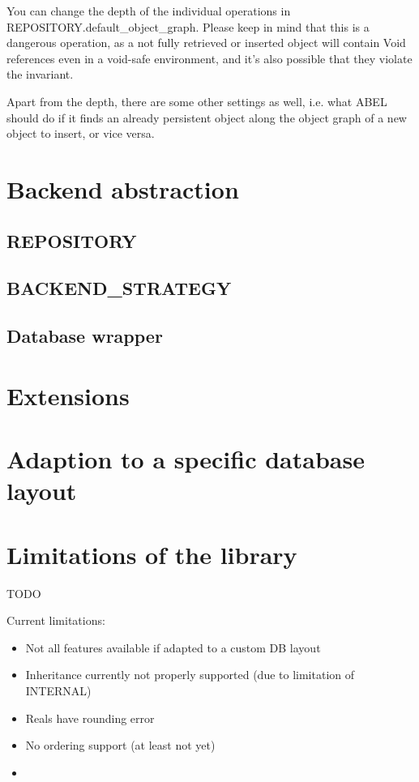 You can change the depth of the individual operations in REPOSITORY.default\_object\_graph. 
Please keep in mind that this is a dangerous operation, as a not fully retrieved or inserted object will contain Void references even in a void-safe environment, and it's also possible that they violate the invariant.

Apart from the depth, there are some other settings as well, i.e. what ABEL should do if it finds an already persistent object along the object graph of a new object to insert, or vice versa.

\section{Backend abstraction}


\subsection{REPOSITORY}

\subsection{BACKEND\_STRATEGY}

\subsection{Database wrapper}


\section{Extensions}

\section{Adaption to a specific database layout}


\section{Limitations of the library}
TODO

Current limitations:
\begin{itemize}
\item Not all features available if adapted to a custom DB layout 
\item Inheritance currently not properly supported (due to limitation of INTERNAL)
\item Reals have rounding error
\item No ordering support (at least not yet)
\item
\end{itemize}

